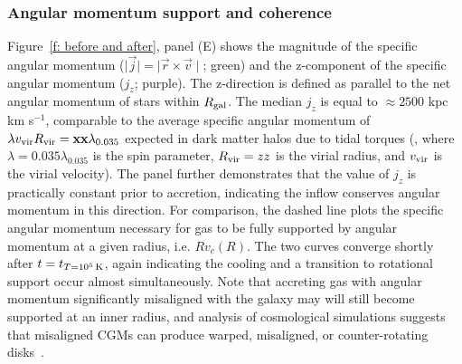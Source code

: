 \documentclass[fleqn,usenatbib]{mnras}
\newcommand{\tcon}{t_{T=10^5\,{\rm K}}}
\newcommand{\Rvir}{R_{\rm vir}}
\newcommand{\vvir}{v_{\rm vir}}
\begin{document}
\subsubsection{Angular momentum support and coherence}
\label{s: mechanics -- angular momentum}

Figure~\ref{f: before and after}, panel (E) shows the magnitude of the specific angular momentum ($\mid \vec j \mid = \mid \vec r \times \vec v \mid$; green) and the z-component of the specific angular momentum ($j_z$; purple).
The z-direction is defined as parallel to the net angular momentum of stars within $R_{\rm gal}$.
The median $j_z$ is equal to $\approx 2500$ kpc km s$^{-1}$, comparable to the average specific angular momentum of $\lambda \vvir \Rvir=\mathbf{xx}\lambda_{0.035}$ expected in dark matter halos due to tidal torques (\cite{Rodriguez2016}, where $\lambda = 0.035 \lambda_{0.035}$ is the spin parameter,  $\Rvir=zz$ is the virial radius, and $\vvir$ is the virial velocity).
The panel further demonstrates that the value of $j_z$ is practically constant prior to accretion, indicating the inflow conserves angular momentum in this direction.
For comparison, the dashed line plots the specific angular momentum necessary for gas to be fully supported by angular momentum at a given radius, i.e. $Rv_c(R)$.
The two curves converge shortly after $t=\tcon$, again indicating the cooling and a transition to rotational support occur almost simultaneously. 
Note that accreting gas with angular momentum significantly misaligned with the galaxy may will still become supported at an inner radius, and analysis of cosmological simulations suggests that misaligned CGMs can produce warped, misaligned, or counter-rotating disks~\citep[e.g.][]{Roskar2010, Starkenburg2019}.
\end{document}

